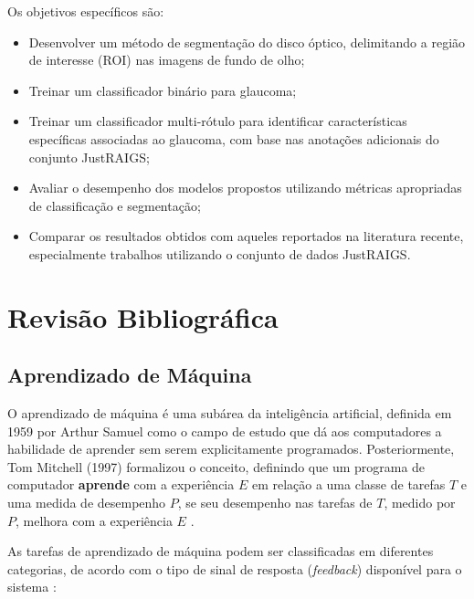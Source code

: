 \documentclass[12pt]{article}
\begin{document}
Os objetivos específicos são:
\begin{itemize}
    \item Desenvolver um método de segmentação do disco óptico, delimitando a região de interesse (ROI) nas imagens de fundo de olho;
    \item Treinar um classificador binário para glaucoma;
    \item Treinar um classificador multi-rótulo para identificar características específicas associadas ao glaucoma, com base nas anotações adicionais do conjunto JustRAIGS;
    \item Avaliar o desempenho dos modelos propostos utilizando métricas apropriadas de classificação e segmentação;
    \item Comparar os resultados obtidos com aqueles reportados na literatura recente, especialmente trabalhos utilizando o conjunto de dados JustRAIGS.
\end{itemize}

\bigskip

\section{Revisão Bibliográfica}
\label{sec:review}

\subsection{Aprendizado de Máquina}
\label{sec:review:machine_learning}

O aprendizado de máquina é uma subárea da inteligência artificial, definida em 1959 por Arthur Samuel como o campo de estudo que dá aos computadores a habilidade de aprender sem serem explicitamente programados. Posteriormente, Tom Mitchell (1997) formalizou o conceito, definindo que um programa de computador \textbf{aprende} com a experiência $E$ em relação a uma classe de tarefas $T$ e uma medida de desempenho $P$, se seu desempenho nas tarefas de $T$, medido por $P$, melhora com a experiência $E$ \cite{mitchell1997machine}.

As tarefas de aprendizado de máquina podem ser classificadas em diferentes categorias, de acordo com o tipo de sinal de resposta (\textit{feedback}) disponível para o sistema \cite{russell2010artificial}:
\end{document}
